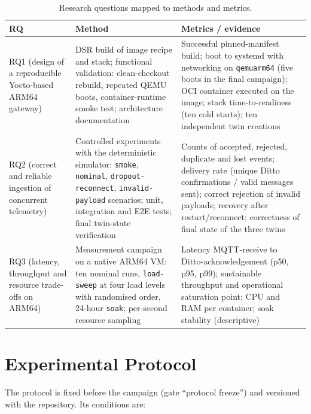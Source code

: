 \begin{table}[htb]
  \caption{Research questions mapped to methods and metrics.}
  \label{tab:rq-matrix}
  \centering
  \small
  \begin{tabular}{p{} p{} p{}}
    \toprule
    \textbf{RQ} & \textbf{Method} & \textbf{Metrics / evidence} \\
    \midrule
    RQ1 (design of a reproducible Yocto-based ARM64 gateway) &
    \ac{DSR} build of image recipe and stack; functional validation: clean-checkout rebuild, repeated QEMU boots, container-runtime smoke test; architecture documentation &
    Successful pinned-manifest build; boot to systemd with networking on \texttt{qemuarm64} (five boots in the final campaign); \ac{OCI} container executed on the image; stack time-to-readiness (ten cold starts); ten independent twin creations \\
    \midrule
    RQ2 (correct and reliable ingestion of concurrent telemetry) &
    Controlled experiments with the deterministic simulator: \texttt{smoke}, \texttt{nominal}, \texttt{dropout-reconnect}, \texttt{invalid-payload} scenarios; unit, integration and \ac{E2E} tests; final twin-state verification &
    Counts of accepted, rejected, duplicate and lost events; delivery rate (unique Ditto confirmations / valid messages sent); correct rejection of invalid payloads; recovery after restart/reconnect; correctness of final state of the three twins \\
    \midrule
    RQ3 (latency, throughput and resource trade-offs on ARM64) &
    Measurement campaign on a native ARM64 \ac{VM}: ten nominal runs, \texttt{load-sweep} at four load levels with randomised order, 24-hour \texttt{soak}; per-second resource sampling &
    Latency \ac{MQTT}-receive to Ditto-acknowledgement (p50, p95, p99); sustainable throughput and operational saturation point; \ac{CPU} and \ac{RAM} per container; soak stability (descriptive) \\
    \bottomrule
  \end{tabular}
\end{table}

\section{Experimental Protocol}
\label{sec:method-protocol}

\noindent The protocol is fixed before the campaign (gate ``protocol freeze'')
and versioned with the repository. Its conditions are:

